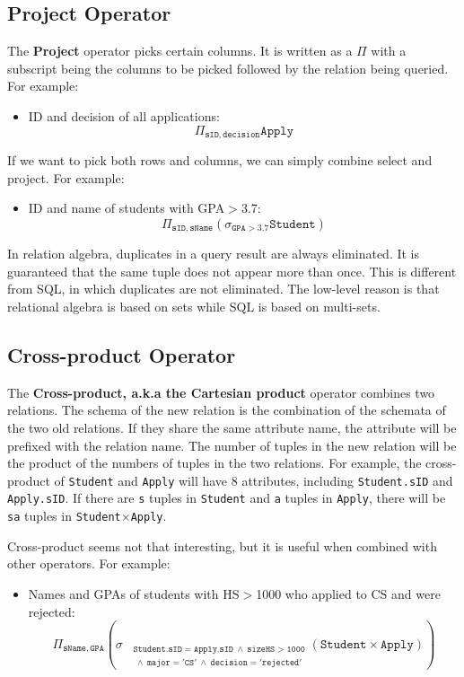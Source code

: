 \subsection{Project Operator}
The \textbf{Project} operator picks certain columns. It is written as a $\Pi$ with a subscript being the columns to be picked followed by the relation being queried. For example:
\begin{itemize}
\item ID and decision of all applications: $$\mathtt{\Pi_{sID, decision}Apply}$$
\end{itemize}
If we want to pick both rows and columns, we can simply combine select and project. For example:
\begin{itemize}
\item ID and name of students with GPA$>$3.7:$$\mathtt{\Pi_{sID,sName}\left(\sigma_{GPA>3.7}Student\right)}$$
\end{itemize}
In relation algebra, duplicates in a query result are always eliminated. It is guaranteed that the same tuple does not appear more than once. This is different from SQL, in which duplicates are not eliminated. The low-level reason is that relational algebra is based on sets while SQL is based on multi-sets.
\subsection{Cross-product Operator}
The \textbf{Cross-product, a.k.a the Cartesian product} operator combines two relations. The schema of the new relation is the combination of the schemata of the two old relations. If they share the same attribute name, the attribute will be prefixed with the relation name. The number of tuples in the new relation will be the product of the numbers of tuples in the two relations. For example, the cross-product of \texttt{Student} and \texttt{Apply} will have 8 attributes, including \texttt{Student.sID} and \texttt{Apply.sID}. If there are \texttt{s} tuples in \texttt{Student} and \texttt{a} tuples in \texttt{Apply}, there will be \texttt{sa} tuples in \texttt{Student$\times$Apply}.

Cross-product seems not that interesting, but it is useful when combined with other operators. For example:
\begin{itemize}
\item Names and GPAs of students with HS$>$1000 who applied to CS and were rejected:
\begin{equation*}
\mathtt{\Pi_{sName,GPA}\left(\sigma_{
\begin{aligned}
&\mathtt{\scriptstyle Student.sID=Apply.sID\:\land\: sizeHS>1000}\\
&\mathtt{\scriptstyle\:\land\: major='CS'\:\land\: decision='rejected'}
\end{aligned}
}\left(Student\times Apply\right)\right)}
\end{equation*}
\end{itemize}
